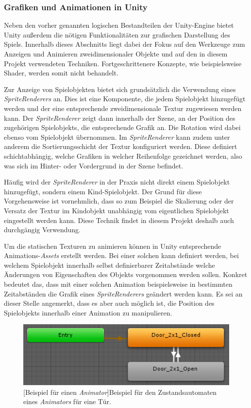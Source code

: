 \subsubsection{Grafiken und Animationen in Unity}\label{sec:unityGrafics}

Neben den vorher genannten logischen Bestandteilen der Unity-Engine bietet Unity außerdem die nötigen Funktionalitäten zur grafischen Darstellung des Spiels. Innerhalb dieses Abschnitts liegt dabei der Fokus auf den Werkzeuge zum Anzeigen und Animieren zweidimensionaler Objekte und auf den in diesem Projekt verwendeten Techniken. Fortgeschrittenere Konzepte, wie beispielsweise Shader, werden somit nicht behandelt.

Zur Anzeige von Spielobjekten bietet sich grundsätzlich die Verwendung eines \textit{SpriteRenderers} \cite{Unity_Doc_SpriteRenderer} an. Dies ist eine Komponente, die jedem Spielobjekt hinzugefügt werden und der eine entsprechende zweidimensionale Textur zugewiesen werden kann. Der \textit{SpriteRenderer} zeigt dann innerhalb der Szene, an der Position des zugehörigen Spielobjekts, die entsprechende Grafik an. Die Rotation wird dabei ebenso vom Spielobjekt übernommen. Im \textit{SpriteRenderer} kann zudem unter anderem die Sortierungsschicht der Textur konfiguriert werden. Diese definiert schichtabhängig, welche Grafiken in welcher Reihenfolge gezeichnet werden, also was sich im Hinter- oder Vordergrund in der Szene befindet.

Häufig wird der \textit{SpriteRenderer} in der Praxis nicht direkt einem Spielobjekt hinzugefügt, sondern einem Kind-Spielobjekt. Der Grund für diese Vorgehensweise ist vornehmlich, dass so zum Beispiel die Skalierung oder der Versatz der Textur im Kindobjekt unabhängig vom eigentlichen Spielobjekt eingestellt werden kann. Diese Technik findet in diesem Projekt deshalb auch durchgängig Verwendung.

Um die statischen Texturen zu animieren können in Unity entsprechende Animations-\textit{Assets} erstellt werden. Bei einer solchen kann definiert werden, bei welchem Spielobjekt innerhalb selbst definierbarer Zeitabstände welche Änderungen von Eigenschaften des Objekts vorgenommen werden sollen. Konkret bedeutet das, dass mit einer solchen Animation beispielsweise in bestimmten Zeitabständen die Grafik eines \textit{SpriteRenderers} geändert werden kann. Es sei an dieser Stelle angemerkt, dass es aber auch möglich ist, die Position des Spielobjekts innerhalb einer Animation zu manipulieren.


\begin{figure}[h]
 \centering
 \includegraphics[width=0.5\linewidth]{pics/animation_example.PNG}
 [Beispiel für einen \textit{Animator}]{Beispiel für den Zustandsautomaten eines \textit{Animators} für eine Tür.}
	\label{fig:animator_example}
\end{figure}

